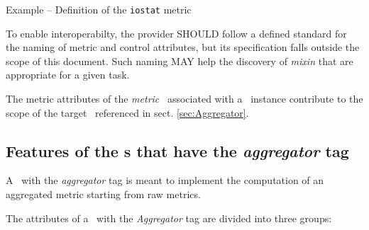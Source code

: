 \documentclass[12pt]{article}  %
\begin{document}
\begin{table}
\caption{Example -- Definition of the {\tt \small iostat} metric \mi \label{tab:iostat} }  
\end{table}

\newcommand{\attrname}[1]{To enable interoperabilty, the provider SHOULD follow a defined standard for the naming of #1 attributes, but its specification falls outside the scope of this document. Such naming MAY help the discovery of {\em mixin} that are appropriate for a given task.}

\attrname{metric and control}

The metric attributes of the {\em metric} \mi\ associated with a \coll\ instance contribute to the scope of the target \sens\ referenced in sect. \ref{sec:Aggregator}.

\subsection{Features of the \mi s that have the {\em aggregator} tag \label{sec:Aggregator}}

A \mi\ with the {\em aggregator} tag is meant to implement the computation of an aggregated metric starting from raw metrics. 


The attributes of a \mi\ with the {\em Aggregator} tag are divided into three groups:
\end{document}
